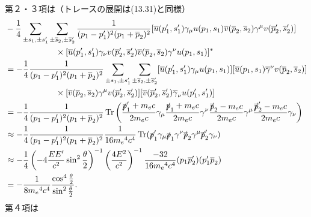 第２・３項は（トレースの展開は(13.31)と同様）
\begin{align*}
  & -\frac{1}{4} \sum_{\pm s_1, \pm s_1'} \sum_{\pm \overline{s}_2, \pm\overline{s}_2'} \frac{1}{(p_1 - p_1')^2(p_1 +\overline{p}_2)^2} [\overline{u}(p_1', s_1') \gamma_\mu u(p_1, s_1) \overline{v}(\overline{p}_2, \overline{s}_2) \gamma^\mu v(\overline{p}_2', \overline{s}_2')] \\
  &\qquad\qquad\qquad \times [\overline{u}(p_1', s_1') \gamma_\nu v(\overline{p}_2', \overline{s}_2') \overline{v}(\overline{p}_2, \overline{s}_2) \gamma^\nu u(p_1, s_1)]^* \\
  & = -\frac{1}{4} \frac{1}{(p_1 - p_1')^2(p_1 +\overline{p}_2)^2} \sum_{\pm s_1, \pm s_1'} \sum_{\pm \overline{s}_2, \pm\overline{s}_2'} [\overline{u}(p_1', s_1') \gamma_\mu u(p_1, s_1)] [\overline{u}(p_1, s_1) \overline{\gamma}^\nu v(\overline{p}_2, \overline{s}_2)] \\
  &\qquad\qquad\qquad \times [\overline{v}(\overline{p}_2, \overline{s}_2) \gamma^\mu v(\overline{p}_2', \overline{s}_2')] [\overline{v}(\overline{p}_2', \overline{s}_2') \overline{\gamma}_\nu u(p_1', s_1')] \\
  & = -\frac{1}{4} \frac{1}{(p_1 - p_1')^2(p_1 +\overline{p}_2)^2} \operatorname{Tr} \left( \frac{\slashed{p}_1'+m_ec}{2m_ec} \gamma_\mu \frac{\slashed{p}_1+m_ec}{2m_ec} \gamma^\nu \frac{\slashed{\overline{p}}_2 - m_ec}{2m_ec} \gamma^\mu \frac{\slashed{\overline{p}}_2' - m_ec}{2m_ec} \gamma_\nu \right) \\
  & \approx -\frac{1}{4} \frac{1}{(p_1 - p_1')^2(p_1 +\overline{p}_2)^2} \frac{1}{16m_e{}^4c^4} \operatorname{Tr} (\slashed{p}_1' \gamma_\mu \slashed{p}_1 \gamma^\nu \slashed{\overline{p}}_2 \gamma^\mu \slashed{\overline{p}}_2' \gamma_\nu) \\
  & \approx -\frac{1}{4} \left(-4\frac{EE'}{c^2}\sin^2\frac{\theta}{2}\right)^{-1} \left(\frac{4E^2}{c^2} \right)^{-1} \frac{-32}{16m_e{}^4c^4} (p_1\overline{p}_2')(p_1'\overline{p}_2) \\
  & = -\frac{1}{8m_e{}^4c^4}\frac{\cos^4\frac{\theta}{2}}{\sin^2\frac{\theta}{2}}.
\end{align*}
第４項は
